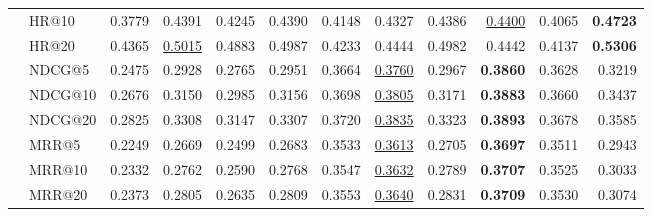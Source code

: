 \begin{tabular}{llrrrrrrrrrr}
 & HR@10 & 0.3779 & 0.4391 & 0.4245 & 0.4390 & 0.4148 & 0.4327 & 0.4386 & \underline{0.4400} & 0.4065 & \textbf{0.4723} \\
 & HR@20 & 0.4365 & \underline{0.5015} & 0.4883 & 0.4987 & 0.4233 & 0.4444 & 0.4982 & 0.4442 & 0.4137 & \textbf{0.5306} \\
 & NDCG@5 & 0.2475 & 0.2928 & 0.2765 & 0.2951 & 0.3664 & \underline{0.3760} & 0.2967 & \textbf{0.3860} & 0.3628 & 0.3219 \\
 & NDCG@10 & 0.2676 & 0.3150 & 0.2985 & 0.3156 & 0.3698 & \underline{0.3805} & 0.3171 & \textbf{0.3883} & 0.3660 & 0.3437 \\
 & NDCG@20 & 0.2825 & 0.3308 & 0.3147 & 0.3307 & 0.3720 & \underline{0.3835} & 0.3323 & \textbf{0.3893} & 0.3678 & 0.3585 \\
 & MRR@5 & 0.2249 & 0.2669 & 0.2499 & 0.2683 & 0.3533 & \underline{0.3613} & 0.2705 & \textbf{0.3697} & 0.3511 & 0.2943 \\
 & MRR@10 & 0.2332 & 0.2762 & 0.2590 & 0.2768 & 0.3547 & \underline{0.3632} & 0.2789 & \textbf{0.3707} & 0.3525 & 0.3033 \\
 & MRR@20 & 0.2373 & 0.2805 & 0.2635 & 0.2809 & 0.3553 & \underline{0.3640} & 0.2831 & \textbf{0.3709} & 0.3530 & 0.3074 \\
\hline
\end{tabular}
